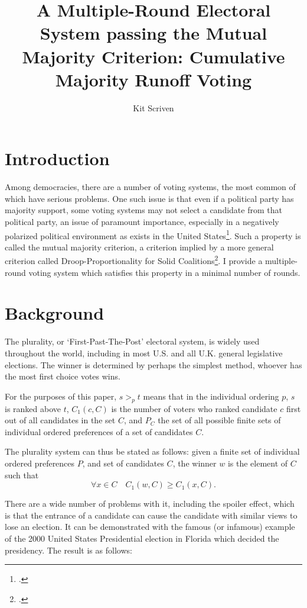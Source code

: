 \documentclass{article}
\author{Kit Scriven}
\title{A Multiple-Round Electoral System passing the Mutual Majority Criterion: Cumulative Majority Runoff Voting}
\begin{document}
\maketitle
\section{Introduction}

Among democracies, there are a number of voting systems, the most common of which have serious problems. One such issue is that even if a political party has majority support, some voting systems may not select a candidate from that political party, an issue of paramount importance, especially in a negatively polarized political environment as exists in the United States\footcite{Abramowitz_2018}. Such a property is called the mutual majority criterion, a criterion implied by a more general criterion called Droop-Proportionality for Solid Coalitions\footcite[9]{Kondratev_2019}. I provide a multiple-round voting system which satisfies this property in a minimal number of rounds.

\section{Background}

The plurality, or `First-Past-The-Post' electoral system, is widely used throughout the world, including in most U.S. and all U.K. general legislative elections. The winner is determined by perhaps the simplest method, whoever has the most first choice votes wins.

For the purposes of this paper, $s >_p t$ means that in the individual ordering $p$, $s$ is ranked above $t$, $C_1(c, C)$ is the number of voters who ranked candidate $c$ first out of all candidates in the set $C$, and $P_C$ the set of all possible finite sets of individual ordered preferences of a set of candidates $C$.

The plurality system can thus be stated as follows: given a finite set of individual ordered preferences $P$, and set of candidates $C$, the winner $w$ is the element of $C$ such that
$$\forall x \in C \quad C_1(w,C) \geq C_1(x,C).$$

There are a wide number of problems with it, including the spoiler effect, which is that the entrance of a candidate can cause the candidate with similar views to lose an election. It can be demonstrated with the famous (or infamous) example of the 2000 United States Presidential election in Florida which decided the presidency. The result is as follows:
\end{document}
